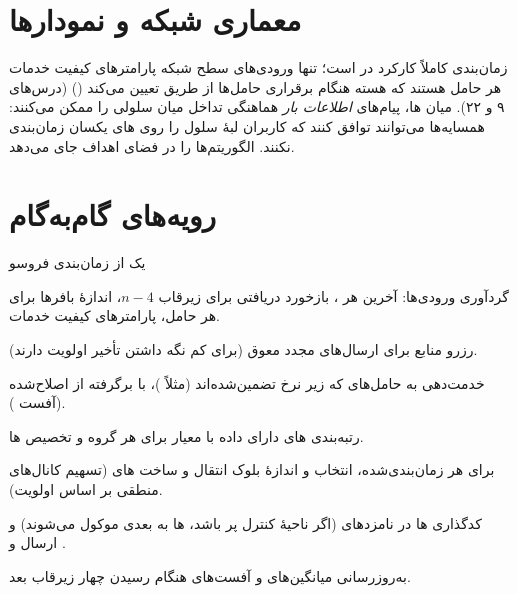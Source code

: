\documentclass[11pt,a4paper]{article}
\begin{document}
\begin{acnfigure}
  \caption{گذردهی هر کاربر با زمان‌بندی نوبتی، منصفانهٔ تناسبی و بیشینهٔ  (شبیه‌سازی \cref{sec:sim}).}
  \label{fig:sched}
\end{acnfigure}

\section{معماری شبکه و نمودارها}
زمان‌بندی کاملاً کارکرد  در  است؛ تنها ورودی‌های سطح شبکه پارامترهای کیفیت خدمات هر حامل
هستند که هسته هنگام برقراری حامل‌ها از طریق  تعیین می‌کند () (درس‌های ۹ و
۲۲). میان ها، پیام‌های \emph{اطلاعات بار}  هماهنگی تداخل میان سلولی را ممکن می‌کنند: همسایه‌ها
می‌توانند توافق کنند که کاربران لبهٔ سلول را روی های یکسان زمان‌بندی نکنند.  الگوریتم‌ها
را در فضای اهداف جای می‌دهد.

\begin{acnfigure}
  \caption{سه‌راهی زمان‌بندی. هیچ الگوریتمی گذردهی، انصاف و کیفیت خدمات را هم‌زمان بیشینه نمی‌کند؛ زمان‌بندهای
  عملی یک مرحلهٔ کیفیت خدمات را با یک مرحلهٔ شبیه  ترکیب می‌کنند.}
  \label{fig:trilemma}
\end{acnfigure}

\section{رویه‌های گام‌به‌گام}
\begin{procedurebox}{یک  از زمان‌بندی فروسو}\label{proc:dl}
\begin{steps}
  \item گردآوری ورودی‌ها: آخرین  هر ، بازخورد  دریافتی برای زیرقاب $n-4$،
        اندازهٔ بافرها برای هر حامل، پارامترهای کیفیت خدمات.
  \item رزرو منابع برای ارسال‌های مجدد  معوق (برای کم نگه داشتن تأخیر اولویت دارند).
  \item خدمت‌دهی به حامل‌های  که زیر نرخ تضمین‌شده‌اند (مثلاً )، با  برگرفته از
         اصلاح‌شده (آفست ).
  \item رتبه‌بندی های دارای داده با معیار  برای هر گروه  و تخصیص ها.
  \item برای هر  زمان‌بندی‌شده، انتخاب  و اندازهٔ بلوک انتقال و ساخت های 
        (تسهیم کانال‌های منطقی بر اساس اولویت).
  \item کدگذاری ها در نامزدهای  (اگر ناحیهٔ کنترل پر باشد، ها به  بعدی موکول
        می‌شوند) و ارسال  و .
  \item به‌روزرسانی میانگین‌های  و آفست‌های  هنگام رسیدن  چهار زیرقاب بعد.
\end{steps}
\end{procedurebox}
\end{document}
